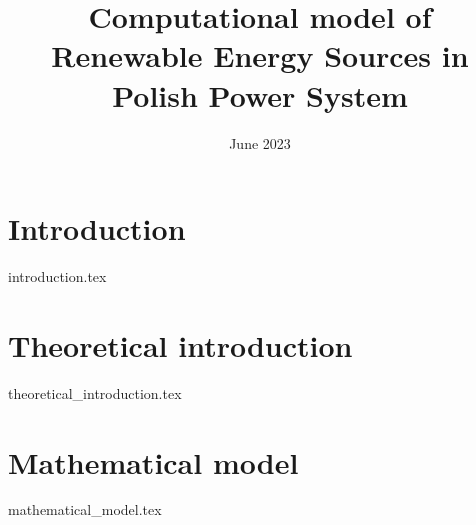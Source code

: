 \documentclass[en]{pracamgr}
\title{Computational model of Renewable Energy Sources in Polish Power System}
\date{June 2023}
\begin{document}
\maketitle

\begin{abstract}
    
\end{abstract}

\tableofcontents

\chapter{Introduction}
{introduction.tex}

\chapter{Theoretical introduction}
{theoretical_introduction.tex}

\chapter{Mathematical model}
{mathematical_model.tex}

\printbibliography
\end{document}
